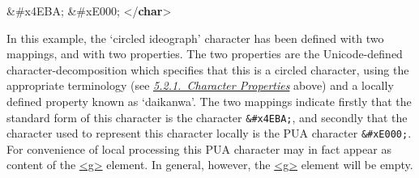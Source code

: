 \begin{shaded}
 \&\#x4EBA;\mbox{}\newline 
{}\mbox{}\newline 
{} \&\#xE000;\mbox{}\newline 
{}\mbox{}\newline 
{</\textbf{char}>}\end{shaded}\egroup\par \par
In this example, the ‘circled ideograph’ character has been defined with two mappings, and with two properties. The two properties are the Unicode-defined character-decomposition which specifies that this is a circled character, using the appropriate terminology (see \textit{\hyperref[ucsprops]{5.2.1.\ Character Properties}} above) and a locally defined property known as ‘daikanwa’. The two mappings indicate firstly that the standard form of this character is the character \texttt{\&\#x4EBA;}, and secondly that the character used to represent this character locally is the PUA character \texttt{\&\#xE000;}. For convenience of local processing this PUA character may in fact appear as content of the \hyperref[TEI.g]{<g>} element. In general, however, the \hyperref[TEI.g]{<g>} element will be empty.
